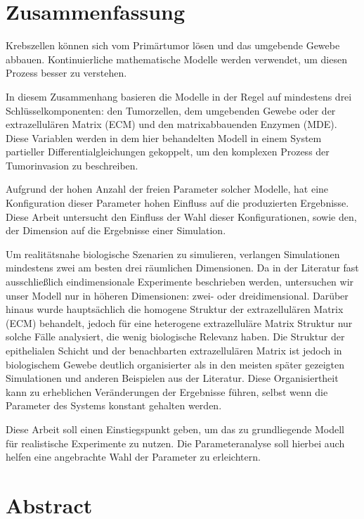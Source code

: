 \section*{Zusammenfassung}

Krebszellen können sich vom Primärtumor lösen und das umgebende Gewebe abbauen. 
Kontinuierliche mathematische Modelle werden verwendet, um diesen Prozess besser zu verstehen.

In diesem Zusammenhang basieren die Modelle in der Regel auf mindestens drei Schlüsselkomponenten: den Tumorzellen, dem umgebenden Gewebe oder der extrazellulären Matrix (ECM) und den matrixabbauenden Enzymen (MDE). Diese Variablen werden in dem hier behandelten Modell in einem System partieller Differentialgleichungen gekoppelt, um den komplexen Prozess der Tumorinvasion zu beschreiben.

Aufgrund der hohen Anzahl der freien Parameter solcher Modelle, hat eine Konfiguration dieser Parameter hohen Einfluss auf die produzierten Ergebnisse. Diese Arbeit untersucht den Einfluss der Wahl dieser Konfigurationen, sowie den, der Dimension auf die Ergebnisse einer Simulation.

Um realitätsnahe biologische Szenarien zu simulieren, verlangen Simulationen mindestens zwei am besten drei räumlichen Dimensionen.
Da in der Literatur fast ausschließlich eindimensionale Experimente beschrieben werden, untersuchen wir unser Modell nur in höheren Dimensionen: zwei- oder dreidimensional. Darüber hinaus wurde hauptsächlich die homogene Struktur der extrazellulären Matrix (ECM) behandelt, jedoch für eine heterogene extrazelluläre Matrix Struktur nur solche Fälle analysiert, die wenig biologische Relevanz haben. Die Struktur der epithelialen Schicht und der benachbarten extrazellulären Matrix ist jedoch in biologischem Gewebe deutlich organisierter als in den meisten später gezeigten Simulationen und anderen Beispielen aus der Literatur. Diese Organisiertheit kann zu erheblichen Veränderungen der Ergebnisse führen, selbst wenn die Parameter des Systems konstant gehalten werden.

Diese Arbeit soll einen Einstiegspunkt geben, um das zu grundliegende Modell für realistische Experimente zu nutzen. Die Parameteranalyse soll hierbei auch helfen eine angebrachte Wahl der Parameter zu erleichtern.

\clearpage
\section*{Abstract}

